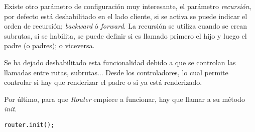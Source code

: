 Existe otro parámetro de configuración muy interesante, el parámetro \emph{recursión}, por defecto está deshabilitado en el lado cliente, si se activa se puede indicar el orden de recursión; \emph{backward} ó \emph{forward}. La recursión se utiliza cuando se crean subrutas, si se habilita, se puede definir si es llamado primero el hijo y luego el padre (o padres); o viceversa.

Se ha dejado deshabilitado esta funcionalidad debido a que se controlan las llamadas entre rutas, subrutas... Desde los controladores, lo cual permite controlar si hay que renderizar el padre o si ya está renderizado.

Por último, para que \emph{Router} empiece a funcionar, hay que llamar a su método \emph{init}.

    \begin{lstlisting}
router.init();
    \end{lstlisting}